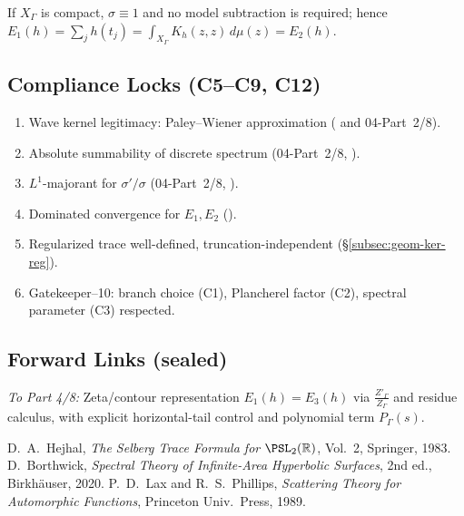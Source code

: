 \begin{remark}\label{rem:compact}\relax
If $X_\Gamma$ is compact, $\sigma\equiv 1$ and no model subtraction is required; hence $E_1(h)=\sum_j h(t_j)=\int_{X_\Gamma}K_h(z,z)\,d\mu(z)=E_2(h)$. %
\end{remark}

\subsection{Compliance Locks (C5–C9, C12)}\relax\hspace{0pt}
\begin{tcolorbox}[colback=gray!3,colframe=gray!50,title={Compliance Check • Part 3/8}] %
\begin{enumerate}[(C5)]
  \item Wave kernel legitimacy: Paley–Wiener approximation ( and 04-Part~2/8). %
  \item Absolute summability of discrete spectrum (04-Part~2/8, ). %
  \item $L^1$-majorant for $\sigma'/\sigma$ (04-Part~2/8, ). %
  \item Dominated convergence for $E_1,E_2$ (). %
  \item Regularized trace well-defined, truncation-independent (\S\ref{subsec:geom-ker-reg}). %
  \item Gatekeeper–10: branch choice (C1), Plancherel factor (C2), spectral parameter (C3) respected. %
\end{enumerate}
\end{tcolorbox}

\subsection*{Forward Links (sealed)}\relax\hspace{0pt}
\noindent
\emph{To Part 4/8:} Zeta/contour representation $E_1(h)=E_3(h)$ via $\frac{Z'_\Gamma}{Z_\Gamma}$ and residue calculus, with explicit horizontal-tail control and polynomial term $P_\Gamma(s)$.\relax\hspace{0pt} %

\begin{thebibliography}{9}
 D.~A.~Hejhal, \emph{The Selberg Trace Formula for $\PSL_2(\mathbb{R})$}, Vol.~2, Springer, 1983. %
 D.~Borthwick, \emph{Spectral Theory of Infinite-Area Hyperbolic Surfaces}, 2nd ed., Birkhäuser, 2020. %
 P.~D.~Lax and R.~S.~Phillips, \emph{Scattering Theory for Automorphic Functions}, Princeton Univ.\ Press, 1989. %
\end{thebibliography}

